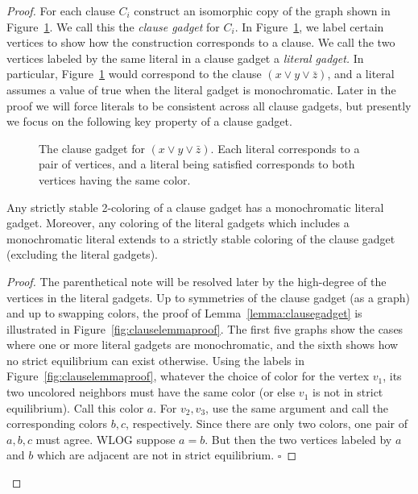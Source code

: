 \documentclass{llncs}
\begin{document}
\begin{proof}
For each clause $C_i$ construct an isomorphic copy of the graph shown in
Figure~\ref{fig:clausegadget}. We call this the \emph{clause gadget} for $C_i$.
In Figure~\ref{fig:clausegadget}, we label certain vertices to show how the
construction corresponds to a clause.  We call the two vertices labeled by the
same literal in a clause gadget a \emph{literal gadget.} In particular,
Figure~\ref{fig:clausegadget} would correspond to the clause $(x \vee y \vee
\bar{z})$, and a literal assumes a value of true when the literal gadget is
monochromatic. Later in the proof we will force literals to be consistent
across all clause gadgets, but presently we focus on the following key property
of a clause gadget.

\begin{figure}[t]
\centering
{}
\caption{The clause gadget for $(x \vee y \vee \bar{z})$. Each literal
corresponds to a pair of vertices, and a literal being satisfied corresponds
to both vertices having the same color.}
\label{fig:clausegadget}
\end{figure}

\begin{lemma}
\label{lemma:clausegadget}
Any strictly stable 2-coloring of a clause gadget has a monochromatic literal
gadget. Moreover, any coloring of the literal gadgets which includes a
monochromatic literal extends to a strictly stable coloring of the clause
gadget (excluding the literal gadgets).
\end{lemma}

\begin{proof}
The parenthetical note will be resolved later by the high-degree of the
vertices in the literal gadgets. Up to symmetries of the clause gadget (as a
graph) and up to swapping colors, the proof of Lemma~\ref{lemma:clausegadget}
is illustrated in Figure~\ref{fig:clauselemmaproof}. The first five graphs show the
cases where one or more literal gadgets are monochromatic, and the sixth shows
how no strict equilibrium can exist otherwise. Using the labels in Figure~\ref{fig:clauselemmaproof}, whatever
the choice of color for the vertex $v_1$, its two uncolored neighbors must have
the same color (or else $v_1$ is not in strict equilibrium). Call this color $a$. For
$v_2, v_3$, use the same argument and call the corresponding colors $b, c$,
respectively. Since there are only two colors, one pair of $a,b,c$ must agree.
WLOG suppose $a=b$. But then the two vertices labeled by $a$ and $b$ which are
adjacent are not in strict equilibrium.
\hfill $\square$
\end{proof}


\end{proof}
\end{document}
